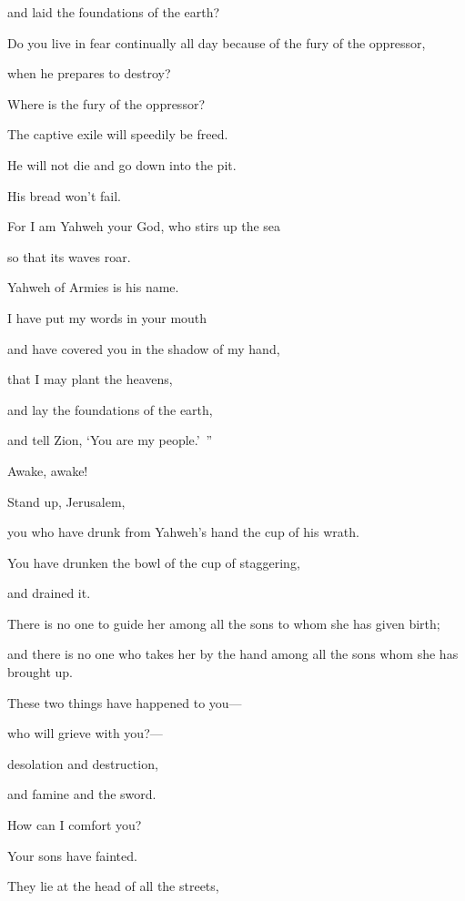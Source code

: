 {\par }{\QB and laid the foundations of the earth?
\par }{\Q Do you live in fear continually all day because of the fury of the oppressor,
\par }{\QB when he prepares to destroy?
\par }{\QB Where is the fury of the oppressor?
\par }{\Q {}The captive exile will speedily be freed.
\par }{\QB He will not die and go down into the pit.
\par }{\QB His bread won’t fail.
\par }{\Q {}For I am Yahweh your God, who stirs up the sea
\par }{\QB so that its waves roar.
\par }{\QB Yahweh of Armies is his name.
\par }{\Q {}I have put my words in your mouth
\par }{\QB and have covered you in the shadow of my hand,
\par }{\Q that I may plant the heavens,
\par }{\QB and lay the foundations of the earth,
\par }{\QB and tell Zion, ‘You are my people.’ ”
\par }{\BB \par }{\Q {}Awake, awake!
\par }{\QB Stand up, Jerusalem,
\par }{\QB you who have drunk from Yahweh’s hand the cup of his wrath.
\par }{\Q You have drunken the bowl of the cup of staggering,
\par }{\QB and drained it.
\par }{\Q {}There is no one to guide her among all the sons to whom she has given birth;
\par }{\QB and there is no one who takes her by the hand among all the sons whom she has brought up.
\par }{\Q {}These two things have happened to you—
\par }{\QB who will grieve with you?—
\par }{\Q desolation and destruction,
\par }{\QB and famine and the sword.
\par }{\QB How can I comfort you?
\par }{\Q {}Your sons have fainted.
\par }{\QB They lie at the head of all the streets,
}
